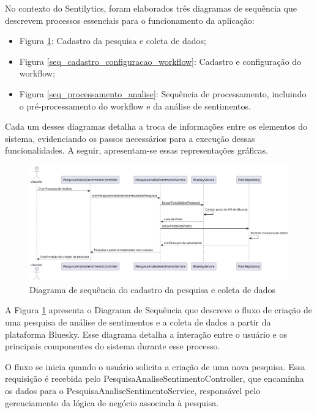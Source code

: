 \documentclass[
	12pt,				%
	oneside,			%
	a4paper,			%
	english,			%
	french,				%
	spanish,			%
	brazil				%
	]{abntex2}
\begin{document}
No contexto do Sentilytics, foram elaborados três diagramas de sequência
que descrevem processos essenciais para o funcionamento da aplicação:

\begin{itemize}
\tightlist
\item
  Figura \ref{seq_pesquisa_coleta_dados}: Cadastro da pesquisa e coleta
  de dados;
\item
  Figura \ref{seq_cadastro_configuracao_workflow}: Cadastro e
  configuração do workflow;
\item
  Figura \ref{seq_processamento_analise}: Sequência de processamento,
  incluindo o pré-processamento do workflow e da análise de sentimentos.
\end{itemize}

Cada um desses diagramas detalha a troca de informações entre os
elementos do sistema, evidenciando os passos necessários para a execução
dessas funcionalidades. A seguir, apresentam-se essas representações
gráficas.

\begin{figure}[htbp]
\hypertarget{seq_pesquisa_coleta_dados}{%
\caption{Diagrama de sequência do cadastro da pesquisa e coleta de dados}\label{seq_pesquisa_coleta_dados}
\begin{center}
\includegraphics[scale=0.4]{imagens/sentilytics/diagramas/sequencia-cadastro-pesquisa-coleta-dados.png}
\end{center}
}
\end{figure}

A Figura \ref{seq_pesquisa_coleta_dados} apresenta o Diagrama de
Sequência que descreve o fluxo de criação de uma pesquisa de análise de
sentimentos e a coleta de dados a partir da plataforma Bluesky. Esse
diagrama detalha a interação entre o usuário e os principais componentes
do sistema durante esse processo.

O fluxo se inicia quando o usuário solicita a criação de uma nova
pesquisa. Essa requisição é recebida pelo
PesquisaAnaliseSentimentoController, que encaminha os dados para o
PesquisaAnaliseSentimentoService, responsável pelo gerenciamento da
lógica de negócio associada à pesquisa.
\end{document}
